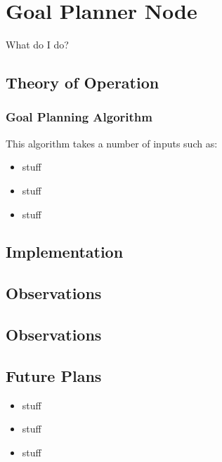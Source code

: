 \section{Goal Planner Node}

What do I do?

\subsection{Theory of Operation}


\subsubsection{Goal Planning Algorithm}
 This algorithm takes a number
of inputs such as:


\begin{itemize}
\item
  stuff
\item
  stuff
\item
  stuff
\end{itemize}


\subsection{Implementation}


\subsection{Observations}


\subsection{Observations}


\subsection{Future Plans}

\begin{itemize}
\item
  stuff
\item
  stuff
\item
  stuff
\end{itemize}
